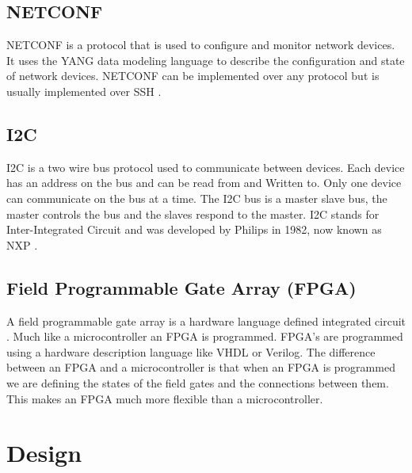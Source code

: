 \documentclass[12pt]{article}
\begin{document}
\subsection{NETCONF}
NETCONF is a protocol that is used to configure and monitor network devices. It uses the YANG data modeling language to describe the configuration and state of network devices.
NETCONF can be implemented over any protocol but is usually implemented over SSH \cite{ennsNetworkConfigurationProtocol2011}.

\subsection{I2C}
I2C is a two wire bus protocol used to communicate between devices. Each device has an address on the bus and can be read from and Written to.
Only one device can communicate on the bus at a time. The I2C bus is a master slave bus, the master controls the bus and the slaves respond to the master.
I2C stands for Inter-Integrated Circuit and was developed by Philips in 1982, now known as NXP \cite{I2CbusSpecificationUser2021}.

\subsection{Field Programmable Gate Array (FPGA)}
A field programmable gate array is a hardware language defined integrated circuit \cite{FieldprogrammableGateArray2025}. 
Much like a microcontroller an FPGA is programmed. FPGA's are programmed using a hardware description language like VHDL or Verilog.
The difference between an FPGA and a microcontroller is that when an FPGA is programmed we are defining 
the states of the field gates and the connections between them. This makes an FPGA much more flexible than a microcontroller.

\section{Design}
\end{document}
